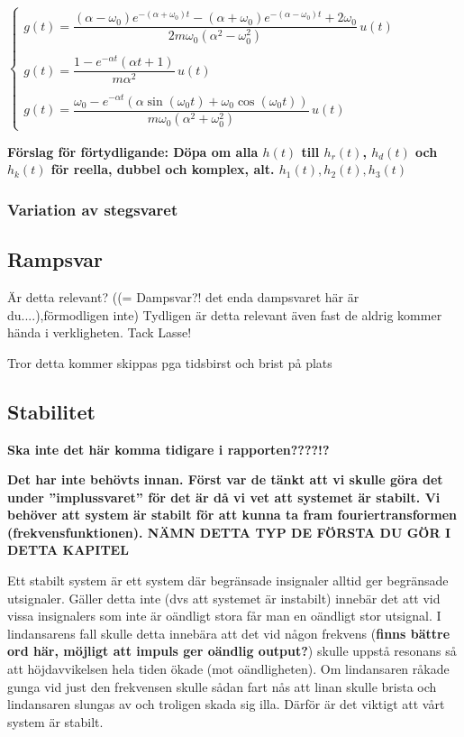 $\begin{cases}
g(t)=\dfrac{(\alpha-\omega_0)e^{-(\alpha+\omega_0)t}-(\alpha+\omega_0)e^{-(\alpha-\omega_0)t}+2\omega_0}{2m\omega_0(\alpha^2-\omega_0^2)}\,u(t) \\\\
g(t)=\dfrac{1-e^{-\alpha t}(\alpha t+1)}{m\alpha^2}\,u(t) \\\\
g(t)=\dfrac{\omega_0-e^{-\alpha t}(\alpha\sin(\omega_0 t)+\omega_0\cos(\omega_0 t))}{m\omega_0(\alpha^2+\omega_0^2)}\,u(t)
\end{cases}$

\textbf{Förslag för förtydligande: Döpa om alla $h(t)$ till $h_r(t)$, $h_d(t)$  och $h_k(t)$ för reella, dubbel och komplex, alt. $h_1(t), h_2(t), h_3(t)$}

\subsubsection{Variation av stegsvaret}
\newpage
\subsection{Rampsvar}
Är detta relevant?
((= Dampsvar?! det enda dampsvaret här är du....),förmodligen inte)
Tydligen är detta relevant även fast de aldrig kommer hända i verkligheten. Tack Lasse!

Tror detta kommer skippas pga tidsbirst och brist på plats
\newpage
\subsection{Stabilitet}
\textbf{Ska inte det här komma tidigare i rapporten????!?}

\textbf{Det har inte behövts innan. Först var de tänkt att vi skulle göra det under ''implussvaret'' för det är då vi vet att systemet är stabilt. Vi behöver att system är stabilt för att kunna ta fram fouriertransformen (frekvensfunktionen). NÄMN DETTA TYP DE FÖRSTA DU GÖR I DETTA KAPITEL}

Ett stabilt system är ett system där begränsade insignaler alltid ger begränsade utsignaler. Gäller detta inte (dvs att systemet är instabilt) innebär det att vid vissa insignalers som inte är oändligt stora får man en oändligt stor utsignal. I lindansarens fall skulle detta innebära att det vid någon frekvens (\textbf{finns bättre ord här, möjligt att impuls ger oändlig output?}) skulle uppstå resonans så att höjdavvikelsen hela tiden ökade (mot oändligheten). Om lindansaren råkade gunga vid just den frekvensen skulle sådan fart nås att linan skulle brista och lindansaren slungas av och troligen skada sig illa. Därför är det viktigt att vårt system är stabilt.

